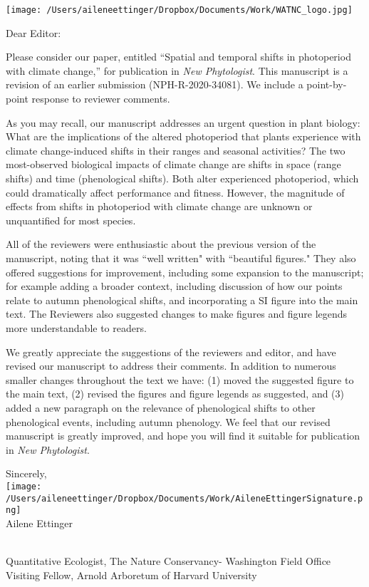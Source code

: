 \documentclass[10.5pt,a4paper]{letter}
\begin{document}
\begin{letter}{}
\texttt{[image: /Users/aileneettinger/Dropbox/Documents/Work/WATNC\_logo.jpg]}

\opening{Dear Editor:}
Please consider our paper, entitled ``Spatial and temporal shifts in photoperiod with climate change,'' for publication in  \emph{New Phytologist}. This manuscript is a revision of an earlier submission (NPH-R-2020-34081). We include a point-by-point response to reviewer comments.

\par As you may recall, our manuscript addresses an urgent question in plant biology: What are the implications
of the altered photoperiod that plants experience with climate change-induced shifts in their ranges and seasonal activities? The two most-observed biological impacts of climate change are shifts in space (range shifts) and time (phenological shifts). Both alter experienced photoperiod, which could dramatically affect performance and fitness. However, the magnitude of effects from shifts in photoperiod with climate change are unknown or unquantified for most species. 

\par All of the reviewers were enthusiastic about the previous version of the manuscript, noting that it was ``well written" with ``beautiful figures." They also offered suggestions for improvement, including some expansion to the manuscript; for example adding a broader context, including discussion of how our points relate to autumn phenological shifts, and incorporating a SI figure into the main text. The Reviewers also suggested changes to make figures and figure legends more understandable to readers. 
\par We greatly appreciate the suggestions of the reviewers and editor, and have revised our manuscript to address their comments. In addition to numerous smaller changes throughout the text we have: (1) moved the suggested figure to the main text, (2) revised the figures and figure legends as suggested, and (3) added a new paragraph on the relevance of phenological shifts to other phenological events, including autumn phenology. We feel that our revised manuscript is greatly improved, and hope you will find it suitable for publication in \emph{New Phytologist}.

\par Sincerely,\\

\texttt{[image: /Users/aileneettinger/Dropbox/Documents/Work/AileneEttingerSignature.png]} \\
Ailene Ettinger
\begin{footnotesize}\\
Quantitative Ecologist, The Nature Conservancy- Washington Field Office\\
Visiting Fellow, Arnold Arboretum of Harvard University 
\end{footnotesize}


\end{letter}
\end{document}
